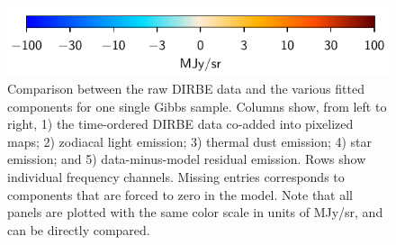 \documentclass{aa}
\begin{document}
\begin{figure}
  \includegraphics[width=0.50\linewidth]{figs/colourbar_MJysr.pdf}
  \caption{Comparison between the raw DIRBE data and the various fitted components for one single Gibbs sample. Columns show, from left to right, 1) the time-ordered DIRBE data co-added into pixelized maps; 2) zodiacal light emission; 3) thermal dust emission; 4) star emission; and 5) data-minus-model residual emission. Rows show individual frequency channels. Missing entries corresponds to components that are forced to zero in the model. Note that all panels are plotted with the same color scale in units of MJy/sr, and can be directly compared.}
  \label{fig:comp_vs_freq}
\end{figure}
\end{document}
